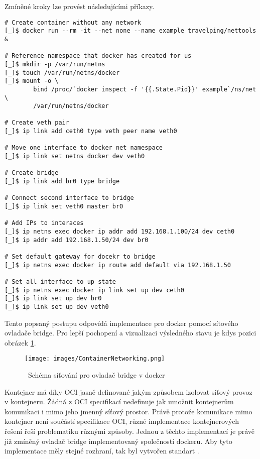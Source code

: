 Zmíněné kroky lze provést následujícími příkazy.
\begin{verbatim}
# Create container without any network
[_]$ docker run --rm -it --net none --name example travelping/nettools &

# Reference namespace that docker has created for us
[_]$ mkdir -p /var/run/netns
[_]$ touch /var/run/netns/docker
[_]$ mount -o \
        bind /proc/`docker inspect -f '{{.State.Pid}}' example`/ns/net \
        /var/run/netns/docker

# Create veth pair
[_]$ ip link add ceth0 type veth peer name veth0

# Move one interface to docker net namespace 
[_]$ ip link set netns docker dev veth0

# Create bridge
[_]$ ip link add br0 type bridge

# Connect second interface to bridge
[_]$ ip link set veth0 master br0

# Add IPs to interaces
[_]$ ip netns exec docker ip addr add 192.168.1.100/24 dev ceth0
[_]$ ip addr add 192.168.1.50/24 dev br0

# Set default gateway for docekr to bridge
[_]$ ip netns exec docker ip route add default via 192.168.1.50

# Set all interface to up state
[_]$ ip netns exec docker ip link set up dev ceth0
[_]$ ip link set up dev br0
[_]$ ip link set up dev veth0
\end{verbatim}

Tento popsaný postupu odpovídá implementace pro docker pomocí sítového ovladače bridge. Pro lepší pochopení a vizualizaci výsledného stavu je kdys pozici obrázek \ref{img:ContainerNetworking}.\\

\begin{figure}[ht]
\centering
\texttt{[image: images/ContainerNetworking.png]}
\caption{~Schéma síťování pro ovladač bridge v docker}\label{img:ContainerNetworking}
\end{figure}

Kontejner má díky OCI jasně definované jakým způsobem izolovat síťový provoz v kontejneru. Žádná z OCI specifikací nedefinuje jak umožnit kontejnerům komunikaci i mimo jeho jmenný síťový prostor. Právě protože komunikace mimo kontejner není součástí specifikace OCI, různé implementace kontejnerových řešení řeší problematiku různými způsoby. Jednou z těchto implementací je právě již zmíněný ovladač bridge implementovaný společností dockeru. Aby tyto implementace měly stejné rozhraní, tak byl vytvořen standart .

